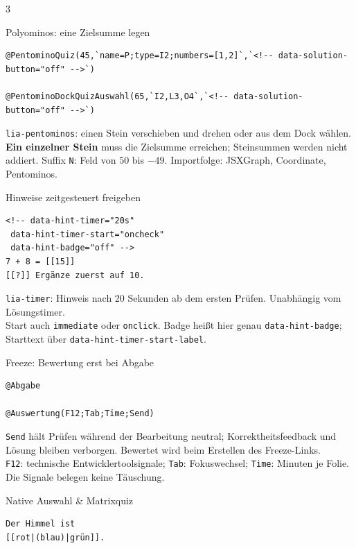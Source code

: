 \documentclass[a4paper,landscape,9pt]{extarticle}
\newcommand{\prevsm}[1]{{\footnotesize\color{muted} #1}}
\begin{document}
\begin{multicols}{3}
\begin{extracard}{Polyominos: eine Zielsumme legen}
\begin{lstlisting}[language=lia]
@PentominoQuiz(45,`name=P;type=I2;numbers=[1,2]`,`<!-- data-solution-button="off" -->`)

@PentominoDockQuizAuswahl(65,`I2,L3,O4`,`<!-- data-solution-button="off" -->`)
\end{lstlisting}
\tcblower
\prevsm{\texttt{lia-pentominos}: einen Stein verschieben und drehen oder aus dem Dock wählen.\\[2pt]
\textbf{Ein einzelner Stein} muss die Zielsumme erreichen; Steinsummen werden nicht addiert. Suffix \texttt{N}: Feld von $50$ bis $-49$. Importfolge: JSXGraph, Coordinate, Pentominos.}
\end{extracard}

\columnbreak

\begin{extracard}{Hinweise zeitgesteuert freigeben}
\begin{lstlisting}[language=lia]
<!-- data-hint-timer="20s"
 data-hint-timer-start="oncheck"
 data-hint-badge="off" -->
7 + 8 = [[15]]
[[?]] Ergänze zuerst auf 10.
\end{lstlisting}
\tcblower
\prevsm{\texttt{lia-timer}: Hinweis nach 20 Sekunden ab dem ersten Prüfen. Unabhängig vom Lösungstimer.\\[2pt]
Start auch \texttt{immediate} oder \texttt{onclick}. Badge heißt hier genau \texttt{data-hint-badge}; Starttext über \texttt{data-hint-timer-start-label}.}
\end{extracard}

\begin{extracard}{Freeze: Bewertung erst bei Abgabe}
\begin{lstlisting}[language=lia]
@Abgabe

@Auswertung(F12;Tab;Time;Send)
\end{lstlisting}
\tcblower
\prevsm{\texttt{Send} hält Prüfen während der Bearbeitung neutral; Korrektheitsfeedback und Lösung bleiben verborgen. Bewertet wird beim Erstellen des Freeze-Links.\\[2pt]
\texttt{F12}: technische Entwicklertoolsignale; \texttt{Tab}: Fokuswechsel; \texttt{Time}: Minuten je Folie. Die Signale belegen keine Täuschung.}
\end{extracard}

\begin{extracard}{Native Auswahl \& Matrixquiz}
\begin{lstlisting}[language=lia]
Der Himmel ist
[[rot|(blau)|grün]].


\end{lstlisting}
\end{extracard}
\end{multicols}
\end{document}
